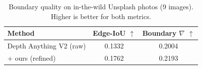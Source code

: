 
\begin{table}[t]
\centering
\caption{Boundary quality on in-the-wild Unsplash photos (9 images). Higher is better for both metrics.}
\label{tab:unsplash}
\begin{tabular}{lcc}
\toprule
Method & Edge-IoU $\uparrow$ & Boundary $\nabla$ $\uparrow$ \\
\midrule
Depth Anything V2 (raw) & 0.1332 & 0.2004 \\
\quad + ours (refined) & 0.1762 & 0.2193 \\
\bottomrule
\end{tabular}
\end{table}
